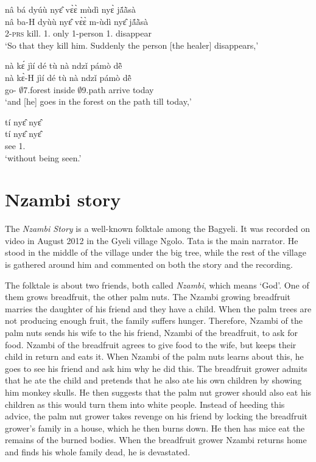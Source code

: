 \begin{exe}[(A34)]
\exA\label{a25}
  \glll   nâ bá dyúù nyɛ̂ vɛ̀ɛ̀ mùdì nyɛ̀ jã́ã̀sà   \\
           nâ ba-H dyùù nyɛ̂ vɛ̀ɛ̀ m-ùdì nyɛ̂ jã́ã̀sà      \\
         {\COMP} 2-\textsc{prs} kill.{\SBJV}  1.{\OBJ} only {\N}1-person 1.{\SBJ}  disappear \\
    \trans `So that they kill him. Suddenly the person [the healer] disappears,'
 
\exA\label{a26}
  \glll    nà kɛ́ jìí dé tù nà ndzǐ pámò dẽ̂  \\
          nà kɛ̀-H jìí dé tù nà ndzǐ pámò dẽ̂   \\
         {\CONJ} go-{\R} $\emptyset$7.forest {\LOC} inside {\COM} $\emptyset$9.path arrive today \\
    \trans `and [he] goes in the forest on the path till today,'
 
\exA\label{a27}
  \glll  tí nyɛ̂ nyɛ̂ \\
        tí nyɛ̂ nyɛ̂\\
           {\NEG} see 1.{\OBJ}\\ 
    \trans `without being seen.'
\end{exe}



\pagebreak


\section{Nzambi story}
\label{sec:Nzambi}

The {\itshape Nzambi Story} is a well-known folktale among the Bagyeli. It was recorded on video in August 2012 in the Gyeli village Ngolo.  Tata is the main narrator. He stood in the middle of the village under the big tree, while the rest of the village is gathered around him and commented on both the story and the recording.

The folktale is about two friends, both called {\itshape Nzambi}, which means `God'. One of them grows breadfruit, the other palm nuts. The Nzambi growing breadfruit marries the daughter of his friend and they have a child. When the palm trees are not producing enough fruit, the family suffers hunger. Therefore, Nzambi of the palm nuts sends his wife to the his friend, Nzambi of the breadfruit, to ask for food. Nzambi of the breadfruit agrees to give food to the wife, but keeps their child in return and eats it. When Nzambi of the palm nuts learns about this, he goes to see his friend and ask him why he did this. The breadfruit grower admits that he ate the child and pretends that he also ate his own children by showing him monkey skulls. He then suggests that the palm nut grower should also eat his children as this would turn them into white people. Instead of heeding this advice, the palm nut grower takes revenge on his friend by locking the breadfruit grower's family in a house, which he then burns down. He then has mice eat the remains of the burned bodies. When the breadfruit grower Nzambi returns home and finds his whole family dead, he is devastated.


